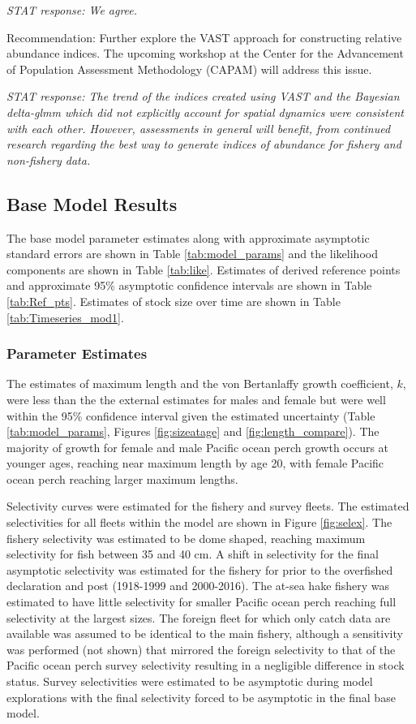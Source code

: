 \documentclass[12pt,]{article}
\begin{document}
\emph{STAT response: We agree.}

Recommendation: Further explore the VAST approach for constructing
relative abundance indices. The upcoming workshop at the Center for the
Advancement of Population Assessment Methodology (CAPAM) will address
this issue.

\emph{STAT response: The trend of the indices created using VAST and the
Bayesian delta-glmm which did not explicitly account for spatial
dynamics were consistent with each other. However, assessments in
general will benefit, from continued research regarding the best way to
generate indices of abundance for fishery and non-fishery data.}

\subsection{Base Model Results}\label{base-model-results}

The base model parameter estimates along with approximate asymptotic
standard errors are shown in Table \ref{tab:model_params} and the
likelihood components are shown in Table \ref{tab:like}. Estimates of
derived reference points and approximate 95\% asymptotic confidence
intervals are shown in Table \ref{tab:Ref_pts}. Estimates of stock size
over time are shown in Table \ref{tab:Timeseries_mod1}.

\subsubsection{Parameter Estimates}\label{parameter-estimates}

The estimates of maximum length and the von Bertanlaffy growth
coefficient, \(k\), were less than the the external estimates for males
and female but were well within the 95\% confidence interval given the
estimated uncertainty (Table \ref{tab:model_params}, Figures
\ref{fig:sizeatage} and \ref{fig:length_compare}). The majority of
growth for female and male Pacific ocean perch growth occurs at younger
ages, reaching near maximum length by age 20, with female Pacific ocean
perch reaching larger maximum lengths.

Selectivity curves were estimated for the fishery and survey fleets. The
estimated selectivities for all fleets within the model are shown in
Figure \ref{fig:selex}. The fishery selectivity was estimated to be dome
shaped, reaching maximum selectivity for fish between 35 and 40 cm. A
shift in selectivity for the final asymptotic selectivity was estimated
for the fishery for prior to the overfished declaration and post
(1918-1999 and 2000-2016). The at-sea hake fishery was estimated to have
little selectivity for smaller Pacific ocean perch reaching full
selectivity at the largest sizes. The foreign fleet for which only catch
data are available was assumed to be identical to the main fishery,
although a sensitivity was performed (not shown) that mirrored the
foreign selectivity to that of the Pacific ocean perch survey
selectivity resulting in a negligible difference in stock status. Survey
selectivities were estimated to be asymptotic during model explorations
with the final selectivity forced to be asymptotic in the final base
model.
\end{document}
